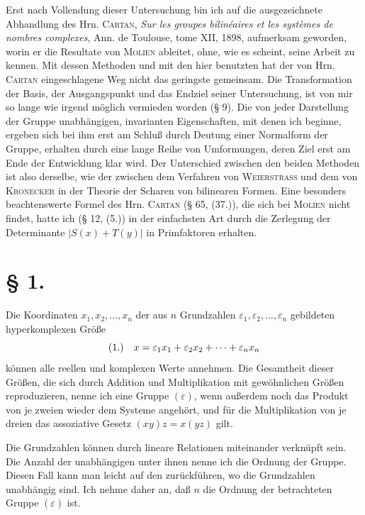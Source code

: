 \documentclass[11pt]{article}
\newcommand{\eps}{\varepsilon}
\newcommand{\fnum}[1]{\textup{(\ensuremath{#1}.)}\quad}
\begin{document}
Erst nach Vollendung dieser Untersuchung bin ich auf die ausgezeichnete Abhandlung des Hrn. \textsc{Cartan}, \emph{Sur les groupes bilinéaires et les systèmes de nombres complexes}, Ann. de Toulouse, tome XII, 1898, aufmerksam geworden, worin er die Resultate von \textsc{Molien} ableitet, ohne, wie es scheint, seine Arbeit zu kennen. Mit dessen Methoden und mit den hier benutzten hat der von Hrn. \textsc{Cartan} eingeschlagene Weg nicht das geringste gemeinsam. Die Transformation der Basis, der Ausgangspunkt und das Endziel seiner Untersuchung, ist von mir so lange wie irgend möglich vermieden worden (§ 9). Die von jeder Darstellung der Gruppe unabhängigen, invarianten Eigenschaften, mit denen ich beginne, ergeben sich bei ihm erst am Schluß durch Deutung einer Normalform der Gruppe, erhalten durch eine lange Reihe von Umformungen, deren Ziel erst am Ende der Entwicklung klar wird. Der Unterschied zwischen den beiden Methoden ist also derselbe, wie der zwischen dem Verfahren von \textsc{Weierstrass} und dem von \textsc{Kronecker} in der Theorie der Scharen von bilinearen Formen. Eine besonders beachtenswerte Formel des Hrn. \textsc{Cartan} (§ 65, (37.)), die sich bei \textsc{Molien} nicht findet, hatte ich (§ 12, (5.)) in der einfachsten Art durch die Zerlegung der Determinante $|S(x)+T(y)|$ in Primfaktoren erhalten.

\section*{§ 1.}

Die Koordinaten $x_1,x_2,\ldots,x_n$ der aus $n$ Grundzahlen $\eps_1,\eps_2,\ldots,\eps_n$ gebildeten hyperkomplexen Größe
\[
\fnum{1} x=\eps_1x_1+\eps_2x_2+\cdots+\eps_nx_n
\]
können alle reellen und komplexen Werte annehmen. Die Gesamtheit dieser Größen, die sich durch Addition und Multiplikation mit gewöhnlichen Größen reproduzieren, nenne ich eine Gruppe $(\eps)$, wenn außerdem noch das Produkt von je zweien wieder dem Systeme angehört, und für die Multiplikation von je dreien das assoziative Gesetz $(xy)z=x(yz)$ gilt.

Die Grundzahlen können durch lineare Relationen miteinander verknüpft sein. Die Anzahl der unabhängigen unter ihnen nenne ich die Ordnung der Gruppe. Diesen Fall kann man leicht auf den zurückführen, wo die Grundzahlen unabhängig sind. Ich nehme daher an, daß $n$ die Ordnung der betrachteten Gruppe $(\eps)$ ist.
\end{document}
